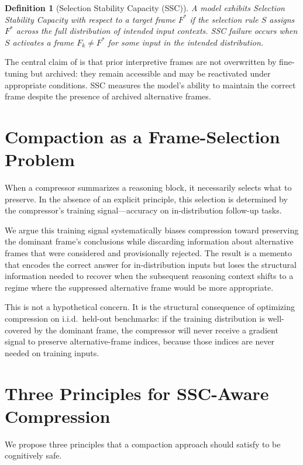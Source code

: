 \documentclass[12pt]{article}
\newtheorem{definition}{Definition}
\begin{document}
\begin{definition}[Selection Stability Capacity (SSC)]
A model exhibits Selection Stability Capacity with respect to a target
frame $F^*$ if the selection rule $S$ assigns $F^*$ across the full
distribution of intended input contexts. SSC failure occurs when $S$
activates a frame $F_k \neq F^*$ for some input in the intended distribution.
\end{definition}

The central claim of \citet{minamoto2026accumulation} is that prior interpretive
frames are not overwritten by fine-tuning but archived: they remain
accessible and may be reactivated under appropriate conditions. SSC
measures the model's ability to maintain the correct frame despite the
presence of archived alternative frames.

\section{Compaction as a Frame-Selection Problem}

When a compressor summarizes a reasoning block, it necessarily selects
what to preserve. In the absence of an explicit principle, this selection
is determined by the compressor's training signal---accuracy on
in-distribution follow-up tasks.

We argue this training signal systematically biases compression toward
preserving the dominant frame's conclusions while discarding information
about alternative frames that were considered and provisionally rejected.
The result is a memento that encodes the correct answer for in-distribution
inputs but loses the structural information needed to recover when the
subsequent reasoning context shifts to a regime where the suppressed
alternative frame would be more appropriate.

This is not a hypothetical concern. It is the structural consequence of
optimizing compression on i.i.d.\ held-out benchmarks: if the training
distribution is well-covered by the dominant frame, the compressor will
never receive a gradient signal to preserve alternative-frame indices,
because those indices are never needed on training inputs.

\section{Three Principles for SSC-Aware Compression}

We propose three principles that a compaction approach should satisfy to
be cognitively safe.
\end{document}
